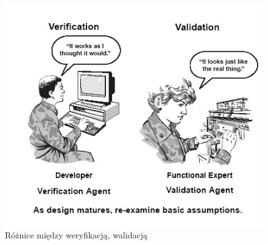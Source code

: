 \documentclass{xmgr}
\begin{document}
\begin{figure}[th!]
\centering
\includegraphics[width=.7\hsize]{images/Verification_Validation_Accreditation}
\caption{Różnice między weryfikacją, walidacją\label{RYS.1}}
\end{figure}
\end{document}
